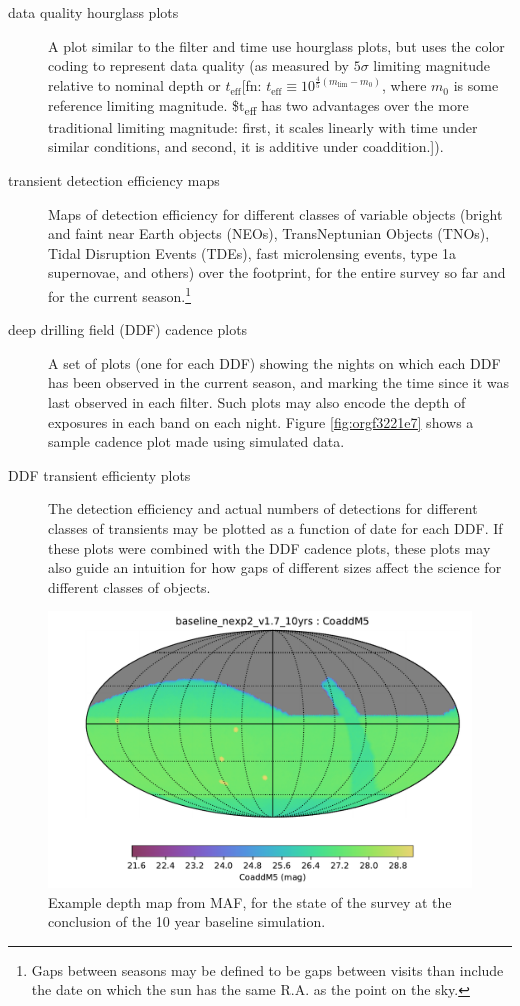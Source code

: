 \begin{description}
\item[{data quality hourglass plots}] A plot similar to the filter and time use hourglass plots, but uses the color coding to represent data quality (as measured by \(5\sigma\) limiting magnitude relative to nominal depth or \(t_{\mbox{eff}}\)[fn: \(t_{\mbox{eff}} \equiv 10^{\frac{4}{5}(m_{\mbox{lim}} - m_{0})}\), where \(m_{0}\) is some reference limiting magnitude. \$t\textsubscript{\mbox{eff}} has two advantages over the more traditional limiting magnitude: first, it scales linearly with time under similar conditions, and second, it is additive under coaddition.]).
\item[{transient detection efficiency maps}] Maps of detection efficiency for different classes of variable objects (bright and faint near Earth objects (NEOs), TransNeptunian Objects (TNOs), Tidal Disruption Events (TDEs), fast microlensing events, type 1a supernovae, and others) over the footprint, for the entire survey so far and for the current season.\footnote{Gaps between seasons may be defined to be gaps between visits than include the date on which the sun has the same R.A. as the point on the sky.}
\item[{deep drilling field (DDF) cadence plots}] A set of plots (one for each DDF) showing the nights on which each DDF has been observed in the current season, and marking the time since it was last observed in each filter. Such plots may also encode the depth of exposures in each band on each night. Figure \ref{fig:orgf3221e7} shows a sample cadence plot made using simulated data.
\item[{DDF transient efficienty plots}] The detection efficiency and actual numbers of detections for different classes of transients may be plotted as a function of date for each DDF. If these plots were combined with the DDF cadence plots, these plots may also guide an intuition for how gaps of different sizes affect the science for different classes of objects.
\end{description}

\begin{figure}[htbp]
\centering
\includegraphics[width=.9\linewidth]{./figures/baseline_nexp2_v1_7_10yrs_CoaddM5_HEAL_SkyMap.pdf}
\caption{\label{fig:org62bc729}Example depth map from MAF, for the state of the survey at the conclusion of the 10 year baseline simulation.}
\end{figure}

